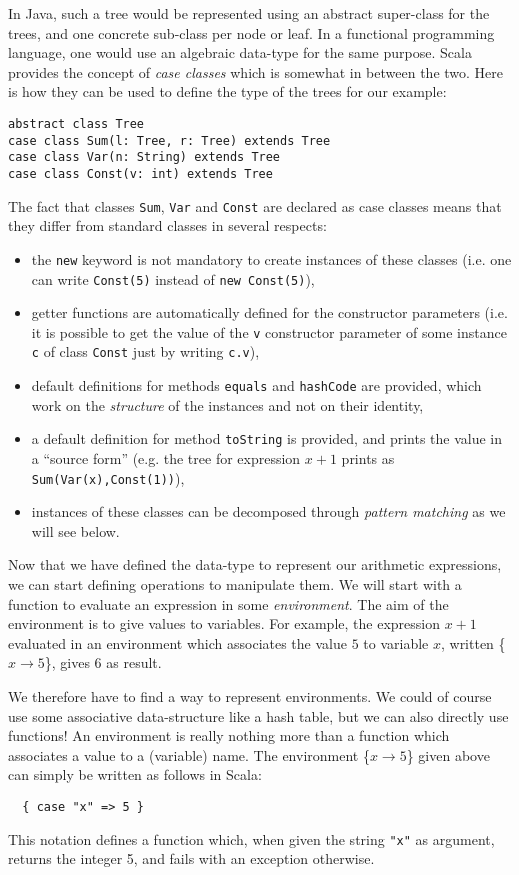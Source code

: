 \documentclass[a4paper,12pt,twoside,titlepage]{article}
\begin{document}
In Java, such a tree would be represented using an abstract
super-class for the trees, and one concrete sub-class per node or
leaf. In a functional programming language, one would use an algebraic
data-type for the same purpose. Scala provides the concept of
\emph{case classes} which is somewhat in between the two. Here is how
they can be used to define the type of the trees for our example:
\begin{lstlisting}
abstract class Tree
case class Sum(l: Tree, r: Tree) extends Tree
case class Var(n: String) extends Tree
case class Const(v: int) extends Tree
\end{lstlisting}
The fact that classes \lstinline?Sum?, \lstinline?Var? and \lstinline?Const? are
declared as case classes means that they differ from standard classes
in several respects:
\begin{itemize}
\item the \lstinline?new? keyword is not mandatory to create instances of
  these classes (i.e. one can write \lstinline?Const(5)? instead of
  \lstinline?new Const(5)?),
\item getter functions are automatically defined for the constructor
  parameters (i.e. it is possible to get the value of the \lstinline?v?
  constructor parameter of some instance \lstinline?c? of class
  \lstinline?Const? just by writing \lstinline?c.v?),
\item default definitions for methods \lstinline?equals? and
  \lstinline?hashCode? are provided, which work on the \emph{structure} of
  the instances and not on their identity,
\item a default definition for method \lstinline?toString? is provided, and
  prints the value in a ``source form'' (e.g. the tree for expression
  $x+1$ prints as \lstinline?Sum(Var(x),Const(1))?),
\item instances of these classes can be decomposed through
  \emph{pattern matching} as we will see below.
\end{itemize}

Now that we have defined the data-type to represent our arithmetic
expressions, we can start defining operations to manipulate them. We
will start with a function to evaluate an expression in some
\emph{environment}. The aim of the environment is to give values to
variables. For example, the expression $x+1$ evaluated in an
environment which associates the value $5$ to variable $x$, written
\{$x\rightarrow 5$\}, gives $6$ as result.

We therefore have to find a way to represent environments. We could of
course use some associative data-structure like a hash table, but we
can also directly use functions! An environment is really nothing more
than a function which associates a value to a (variable) name. The
environment \{$x\rightarrow 5$\} given above can simply be written as
follows in Scala:
\begin{lstlisting}
  { case "x" => 5 }
\end{lstlisting}
This notation defines a function which, when given the string
\lstinline?"x"? as argument, returns the integer 5, and fails with an
exception otherwise.
\end{document}
